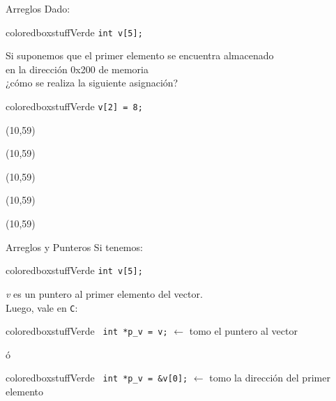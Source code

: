\documentclass[aspectratio=169]{beamer}
\begin{document}
\begin{frame}[fragile,t]{Arreglos}
    Dado:\\
    \vskip 5pt
    \begin{beamercolorbox}[wd=0.9\textwidth,sep=0.5em]{coloredboxstuffVerde}
    \verb|int v[5];|\\
    \end{beamercolorbox}
    \pause
    Si suponemos que el primer elemento se encuentra almacenado\\  en la dirección 0x200 de memoria\\
    \vskip 5pt
    ¿cómo se realiza la siguiente asignación?
    \pause
    \vskip 5pt
    \begin{beamercolorbox}[wd=0.9\textwidth,sep=0.5em]{coloredboxstuffVerde}
    \verb|v[2] = 8;|
    \pause
    \end{beamercolorbox}
    \begin{textblock}{50}(10,59)  \end{textblock}
    \begin{textblock}{50}(10,59)  \end{textblock}
    \begin{textblock}{50}(10,59)  \end{textblock}
    \begin{textblock}{50}(10,59)  \end{textblock}
    \begin{textblock}{50}(10,59)  \end{textblock}
\end{frame}

\begin{frame}[fragile]{Arreglos y Punteros}
    Si tenemos:
    \vskip 5pt
    \begin{beamercolorbox}[wd=1\textwidth,sep=0.5em]{coloredboxstuffVerde}
    \verb|int v[5];| 
    \end{beamercolorbox}
    \vskip 5pt
    \textit{v} es un puntero al primer elemento del vector.\\ 
    \vskip 15pt
    \pause
    Luego, vale en \texttt{C}:
    \vskip 15pt
    \begin{beamercolorbox}[wd=1\textwidth,sep=0.5em]{coloredboxstuffVerde}
    \verb| int *p_v = v;| $\leftarrow$ \footnotesize tomo el puntero al vector
    \end{beamercolorbox}
    \begin{center}
    \vskip -7pt
    ó
    \end{center}
    \begin{beamercolorbox}[wd=1\textwidth,sep=0.5em]{coloredboxstuffVerde}
    \verb| int *p_v = &v[0];| $\leftarrow$ \footnotesize tomo la dirección del primer elemento
    \end{beamercolorbox}
\end{frame}
\end{document}
